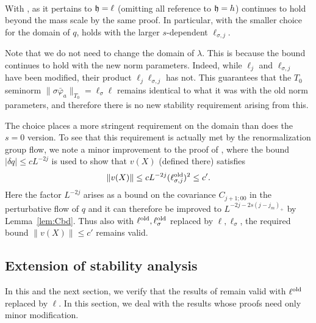 \paragraph{\cite[Proposition~\ref{IE-prop:monobd}]{BS-rg-IE}}
With , \cite[Proposition~\ref{IE-prop:monobd}]{BS-rg-IE}
as it pertains to $\mathfrak{h}=\ell$ (omitting all reference to $\mathfrak{h}=h$) continues to hold beyond
the mass scale by the same proof.
In particular, with the smaller choice for the domain of $q$,
\cite[\eqref{IE-e:qhsig}]{BS-rg-IE} holds with the larger $s$-dependent $\ell_{\sigma,j}$.

\medskip
Note that we do not need to change the domain of $\lambda$.
This is because the bound \cite[\eqref{IE-e:hsigh}]{BS-rg-IE}
continues to hold with the new norm parameters. Indeed, while $\ell_j$
and $\ell_{\sigma,j}$ have been modified, their product $\ell_j \ell_{\sigma,j}$
has not.
This guarantees that the $T_0$ seminorm
$\|\sigma\bar\varphi_a\|_{T_0} = \ell_\sigma \ell$ remains identical to what it was
with the old norm parameters, and therefore there is no new stability requirement
arising from this.

The choice  places a more stringent requirement on the domain
than does the $s=0$ version.  To see that this requirement is actually met
by the renormalization group flow,
we note a minor improvement to the proof of \cite[Lemma~\ref{step-lem:K7a}(ii)]{BS-rg-step},
where the bound $|\delta q| \leq c L^{-2j}$ is used to show that $v(X)$
(defined there) satisfies
\begin{equation}
\lbeq{vXbd}
\|v(X)\| \leq c L^{-2j} (\ell_{\sigma,j}^\oldrm)^2 \leq c'.
\end{equation}
Here the factor $L^{-2j}$ arises
as a bound on the covariance $C_{j+1;00}$ in the perturbative flow
\cite[\eqref{pt-e:qpt2}]{BS-rg-IE} of $q$ and it can therefore be improved to $L^{-2j-2s(j - j_m)_+}$
by Lemma~\ref{lem:Cbd}.
Thus also with $\ell^{\mathrm{old}}, \ell_{\sigma}^{\rm old}$ replaced by $\ell,\ell_{\sigma}$,
the required bound $\|v(X)\| \leq c'$ remains valid.


\subsection{Extension of stability analysis}
\label{sec:stability2}

In this and the next section,
we verify that the results of \cite[Section~\ref{IE-sec:IE}]{BS-rg-IE}
remain valid with $\ell^{\mathrm{old}}$ replaced by $\ell$.
In this section, we deal with the results whose proofs need only minor
modification.

